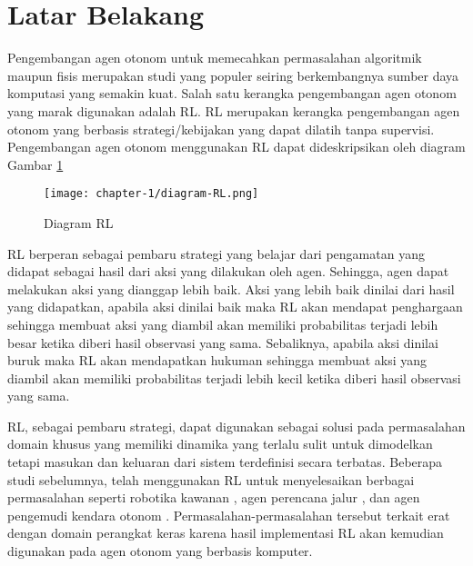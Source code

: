\section{Latar Belakang}

Pengembangan agen otonom untuk memecahkan permasalahan algoritmik maupun fisis merupakan studi yang populer seiring berkembangnya sumber daya komputasi yang semakin kuat. Salah satu kerangka pengembangan agen otonom yang marak digunakan adalah \ac{RL}. \ac{RL} merupakan kerangka pengembangan agen otonom yang berbasis strategi/kebijakan yang dapat dilatih tanpa supervisi. Pengembangan agen otonom menggunakan \ac{RL} dapat dideskripsikan oleh diagram Gambar \ref{fig:RL-diagram}

\begin{figure}[h]
	\centering
	\texttt{[image: chapter-1/diagram-RL.png]}
	\caption{Diagram \acl{RL}}
	\label{fig:RL-diagram}
\end{figure}

\ac{RL} berperan sebagai pembaru strategi yang belajar dari pengamatan yang didapat sebagai hasil dari aksi yang dilakukan oleh agen. Sehingga, agen dapat melakukan aksi yang dianggap lebih baik. Aksi yang lebih baik dinilai dari hasil yang didapatkan, apabila aksi dinilai baik maka \ac{RL} akan mendapat penghargaan sehingga membuat aksi yang diambil akan memiliki probabilitas terjadi lebih besar ketika diberi hasil observasi yang sama. Sebaliknya, apabila aksi dinilai buruk maka \ac{RL} akan mendapatkan hukuman sehingga membuat aksi yang diambil akan memiliki probabilitas terjadi lebih kecil ketika diberi hasil observasi yang sama.

\ac{RL}, sebagai pembaru strategi, dapat digunakan sebagai solusi pada permasalahan domain khusus yang memiliki dinamika yang terlalu sulit untuk dimodelkan tetapi masukan dan keluaran dari sistem terdefinisi secara terbatas. Beberapa studi sebelumnya, telah menggunakan RL untuk menyelesaikan berbagai permasalahan seperti robotika kawanan \parencite{hubert2022perancangan}, agen perencana jalur \parencite{dawne2023algoritma}, dan agen pengemudi kendara otonom \parencite{mardhatillah2023strategi}. Permasalahan-permasalahan tersebut terkait erat dengan domain perangkat keras karena hasil implementasi RL akan kemudian digunakan pada agen otonom yang berbasis komputer.

